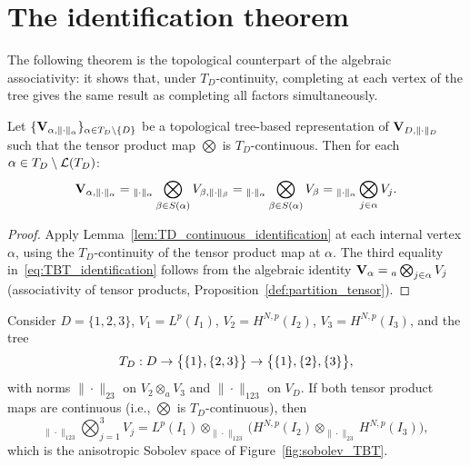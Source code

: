 \section{The identification theorem}
\label{sec:topTBT:identification}

The following theorem is the topological counterpart of the algebraic
associativity: it shows that, under $T_D$-continuity, completing at
each vertex of the tree gives the same result as completing all factors
simultaneously.

\begin{theorem}
\label{thm:TBT_identification}
Let $\{\mathbf{V}_{\alpha,\|\cdot\|_\alpha}\}_{\alpha \in T_D \setminus \{D\}}$ be a
topological tree-based representation of $\mathbf{V}_{D,\|\cdot\|_D}$ such that the
tensor product map $\bigotimes$ is $T_D$-continuous. Then for each
$\alpha \in T_D \setminus \mathcal{L}(T_D)$:
\begin{equation}
\label{eq:TBT_identification}
    \mathbf{V}_{\alpha,\|\cdot\|_\alpha}
    = {}_{\|\cdot\|_\alpha}\bigotimes_{\beta \in S(\alpha)}
      V_{\beta,\|\cdot\|_\beta}
    = {}_{\|\cdot\|_\alpha}\bigotimes_{\beta \in S(\alpha)} V_\beta
    = {}_{\|\cdot\|_\alpha}\bigotimes_{j \in \alpha} V_j.
\end{equation}
\end{theorem}

\begin{proof}
Apply Lemma~\ref{lem:TD_continuous_identification} at each internal
vertex $\alpha$, using the $T_D$-continuity of the tensor product map
at $\alpha$. The third equality in~\eqref{eq:TBT_identification}
follows from the algebraic identity $\mathbf{V}_\alpha =
{}_a\bigotimes_{j \in \alpha} V_j$ (associativity of tensor products,
Proposition~\ref{def:partition_tensor}).
\end{proof}

\begin{example}
\label{ex:sobolev_TBT}
Consider $D = \{1,2,3\}$, $V_1 = L^p(I_1)$,
$V_2 = H^{N,p}(I_2)$, $V_3 = H^{N,p}(I_3)$, and the tree
\begin{equation*}
    T_D: D \to \bigl\{\{1\}, \{2,3\}\bigr\} \to
    \bigl\{\{1\},\{2\},\{3\}\bigr\},
\end{equation*}
with norms $\|\cdot\|_{23}$ on $V_2 \otimes_a V_3$ and
$\|\cdot\|_{123}$ on $V_D$. If both tensor product maps are continuous
(i.e., $\bigotimes$ is $T_D$-continuous), then
\begin{equation*}
    {}_{\|\cdot\|_{123}}\bigotimes_{j=1}^3 V_j
    = L^p(I_1) \otimes_{\|\cdot\|_{123}}
      \bigl(H^{N,p}(I_2) \otimes_{\|\cdot\|_{23}} H^{N,p}(I_3)\bigr),
\end{equation*}
which is the anisotropic Sobolev space of Figure~\ref{fig:sobolev_TBT}.
\end{example}

